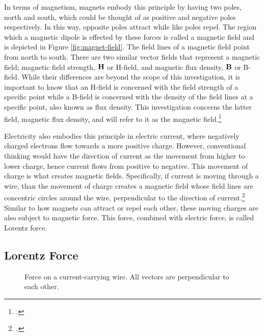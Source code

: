 In terms of magnetism, magnets embody this principle by having two poles, north and south, which could be thought of as positive and negative poles respectively.
In this way, opposite poles attract while like poles repel.
The region which a magnetic dipole is effected by these forces is called a magnetic field and is depicted in Figure \ref{fig:magnet-field}.
The field lines of a magnetic field point from north to south.
There are two similar vector fields that represent a magnetic field; magnetic field strength, $\bm{\mathbf{H}}$ or H-field, and magnetic flux density, $\bm{\mathbf{B}}$ or B-field.
While their differences are beyond the scope of this investigation, it is important to know that an H-field is concerned with the field strength of a specific point while a B-field is concerned with the density of the field lines at a specific point, also known as flux density.
This investigation concerns the latter field, magnetic flux density, and will refer to it as the magnetic field.\footcite{britfields}

Electricity also embodies this principle in electric current, where negatively charged electrons flow towards a more positive charge.
However, conventional thinking would have the direction of current as the movement from higher to lower charge, hence current flows from positive to negative.
This movement of charge is what creates magnetic fields.
Specifically, if current is moving through a wire, than the movement of charge creates a magnetic field whose field lines are concentric circles around the wire, perpendicular to the direction of current.\footcite{msufields}
Similar to how magnets can attract or repel each other, these moving charges are also subject to magnetic force.
This force, combined with electric force, is called Lorentz force.

\subsection*{Lorentz Force}

\begin{figure}
	\centering
	\caption{Force on a current-carrying wire. All vectors are perpendicular to each other.}
	\label{fig:laplace-force}
\end{figure}

